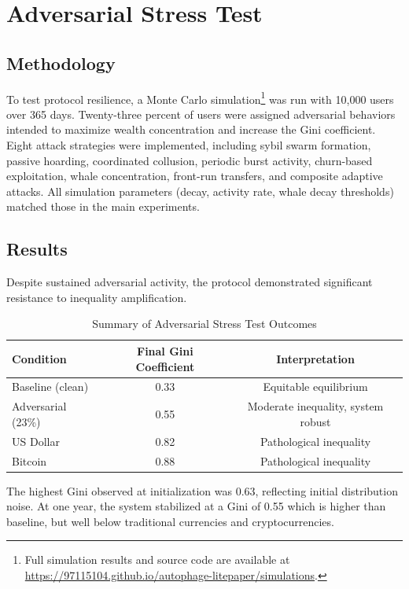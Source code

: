 \documentclass[11pt,letterpaper]{article}
\begin{document}
\section{Adversarial Stress Test}

\subsection*{Methodology}

To test protocol resilience, a Monte Carlo simulation\footnote{Full simulation results and source code are available at \url{https://97115104.github.io/autophage-litepaper/simulations}.} was run with 10,000 users over 365 days. Twenty-three percent of users were assigned adversarial behaviors intended to maximize wealth concentration and increase the Gini coefficient. Eight attack strategies were implemented, including sybil swarm formation, passive hoarding, coordinated collusion, periodic burst activity, churn-based exploitation, whale concentration, front-run transfers, and composite adaptive attacks. All simulation parameters (decay, activity rate, whale decay thresholds) matched those in the main experiments.

\subsection*{Results}

Despite sustained adversarial activity, the protocol demonstrated significant resistance to inequality amplification.

\begin{table}[H]
\centering
\caption{Summary of Adversarial Stress Test Outcomes}
\begin{tabular}{lcc}
\toprule
\textbf{Condition} & \textbf{Final Gini Coefficient} & \textbf{Interpretation} \\
\midrule
Baseline (clean) & 0.33 & Equitable equilibrium \\
Adversarial (23\%) & 0.55 & Moderate inequality, system robust \\
US Dollar & 0.82 & Pathological inequality \\
Bitcoin & 0.88 & Pathological inequality \\
\bottomrule
\end{tabular}
\end{table}

The highest Gini observed at initialization was 0.63, reflecting initial distribution noise. At one year, the system stabilized at a Gini of 0.55 which is higher than baseline, but well below traditional currencies and cryptocurrencies.
\end{document}
